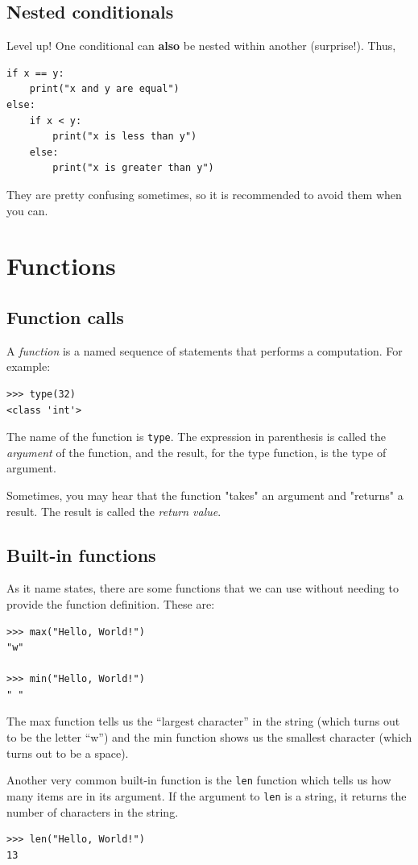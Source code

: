 \subsection{Nested conditionals}
Level up! One conditional can \textbf{also} be nested within another (surprise!). Thus,
\begin{verbatim}
if x == y:
    print("x and y are equal")
else:
    if x < y:
        print("x is less than y")
    else:
        print("x is greater than y")
\end{verbatim}
They are pretty confusing sometimes, so it is recommended to avoid them when you can. 

\section{Functions}
\subsection{Function calls}
A \textit{function} is a named sequence of statements that performs a computation. For example:
\begin{verbatim}
>>> type(32)
<class 'int'>
\end{verbatim}
The name of the function is \texttt{type}. The expression in parenthesis is called the \textit{argument} of the function, and the result, for the type function, is the type of argument.

Sometimes, you may hear that the function "takes" an argument and "returns" a result. The result is called the \textit{return value}.

\subsection{Built-in functions}
As it name states, there are some functions that we can use without needing to provide the function definition. These are:
\begin{verbatim}
>>> max("Hello, World!")
"w"
    
>>> min("Hello, World!")
" "
\end{verbatim}
The max function tells us the “largest character” in the string (which turns out to be the letter “w”) and the min function shows us the smallest character (which turns out to be a space).

Another very common built-in function is the \texttt{len} function which tells us how many
items are in its argument. If the argument to \texttt{len} is a string, it returns the number of characters in the string.
\begin{verbatim}
>>> len("Hello, World!")
13
\end{verbatim}

